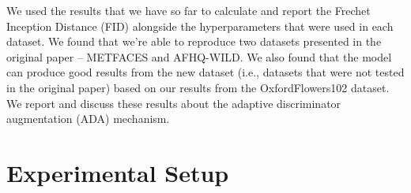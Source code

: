 \documentclass{report}
\begin{document}
We used the results that we have so far to calculate and report the Frechet Inception Distance (FID) alongside the hyperparameters that were used in each dataset. We found that we're able to reproduce two datasets presented in the original paper – METFACES and AFHQ-WILD. We also found that the model can produce good results from the new dataset (i.e., datasets that were not tested in the original paper) based on our results from the OxfordFlowers102 dataset. We report and discuss these results about the adaptive discriminator augmentation (ADA) mechanism. 



\section{Experimental Setup}
\label{sec:M3-setup}

\end{document}
